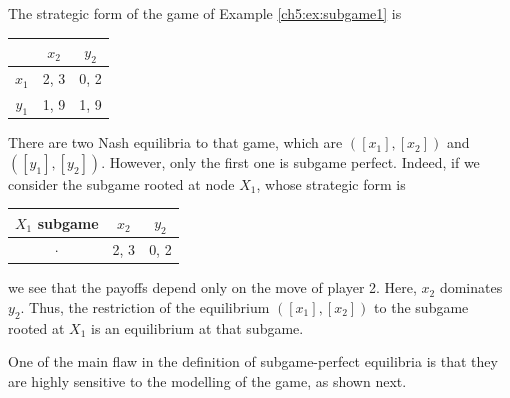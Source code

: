 \begin{example}
The strategic form of the game of Example \ref{ch5:ex:subgame1}
is
\begin{center}
\begin{tabular}{c|cc}
& $x_2$ & $y_2$ \\
\hline
$x_1$ & 2,  3 & 0, 2 \\
$y_1$ & 1, 9 & 1, 9
\end{tabular}
\end{center}
There are two Nash equilibria to that game, which are $([x_1], [x_2])$ and $([y_1], [y_2])$. However, only the first one is subgame perfect. Indeed, if we consider the subgame rooted at node $X_1$, whose strategic form is
\begin{center}
\begin{tabular}{c|cc}
$X_1$ subgame & $x_2$ & $y_2$ \\
\hline
$\cdot$ & 2, 3 & 0, 2 \\
\end{tabular}
\end{center}
we see that the payoffs depend only on the move of player 2. Here, $x_2$ dominates $y_2$. Thus, the restriction of the equilibrium $([x_1], [x_2])$ to the subgame rooted at $X_1$ is an equilibrium at that subgame.\\
\end{example}
One of the main flaw in the definition of subgame-perfect equilibria is that they are highly sensitive to the modelling of the game, as shown next.
